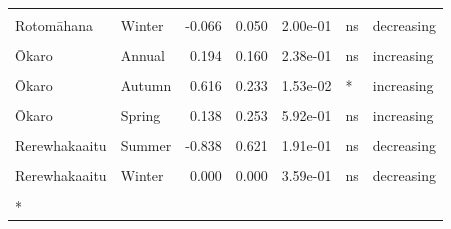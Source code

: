 \documentclass[
  12pt,
  a4paper,
  oneside]{scrbook}
\begin{document}
\begin{longtable}[t]{llrrrll}
\cellcolor{gray!8}{Rotomāhana} & \cellcolor{gray!8}{Autumn} & \cellcolor{gray!8}{-2.721} & \cellcolor{gray!8}{0.545} & \cellcolor{gray!8}{1.12e-04} & \cellcolor{gray!8}{***} & \cellcolor{gray!8}{decreasing}\\
Rotomāhana & Winter & -0.066 & 0.050 & 2.00e-01 & ns & decreasing\\
\cellcolor{gray!8}{Rotomāhana} & \cellcolor{gray!8}{Spring} & \cellcolor{gray!8}{-0.133} & \cellcolor{gray!8}{0.072} & \cellcolor{gray!8}{8.13e-02} & \cellcolor{gray!8}{ns} & \cellcolor{gray!8}{decreasing}\\
\addlinespace
Ōkaro & Annual & 0.194 & 0.160 & 2.38e-01 & ns & increasing\\
\cellcolor{gray!8}{Ōkaro} & \cellcolor{gray!8}{Summer} & \cellcolor{gray!8}{0.142} & \cellcolor{gray!8}{0.346} & \cellcolor{gray!8}{6.85e-01} & \cellcolor{gray!8}{ns} & \cellcolor{gray!8}{increasing}\\
Ōkaro & Autumn & 0.616 & 0.233 & 1.53e-02 & * & increasing\\
\cellcolor{gray!8}{Ōkaro} & \cellcolor{gray!8}{Winter} & \cellcolor{gray!8}{-0.086} & \cellcolor{gray!8}{0.272} & \cellcolor{gray!8}{7.55e-01} & \cellcolor{gray!8}{ns} & \cellcolor{gray!8}{decreasing}\\
Ōkaro & Spring & 0.138 & 0.253 & 5.92e-01 & ns & increasing\\
\addlinespace
\cellcolor{gray!8}{Rerewhakaaitu} & \cellcolor{gray!8}{Annual} & \cellcolor{gray!8}{-0.406} & \cellcolor{gray!8}{0.207} & \cellcolor{gray!8}{6.32e-02} & \cellcolor{gray!8}{ns} & \cellcolor{gray!8}{decreasing}\\
Rerewhakaaitu & Summer & -0.838 & 0.621 & 1.91e-01 & ns & decreasing\\
\cellcolor{gray!8}{Rerewhakaaitu} & \cellcolor{gray!8}{Autumn} & \cellcolor{gray!8}{-0.203} & \cellcolor{gray!8}{0.200} & \cellcolor{gray!8}{3.21e-01} & \cellcolor{gray!8}{ns} & \cellcolor{gray!8}{decreasing}\\
Rerewhakaaitu & Winter & 0.000 & 0.000 & 3.59e-01 & ns & decreasing\\
\cellcolor{gray!8}{Rerewhakaaitu} & \cellcolor{gray!8}{Spring} & \cellcolor{gray!8}{-0.255} & \cellcolor{gray!8}{0.275} & \cellcolor{gray!8}{3.64e-01} & \cellcolor{gray!8}{ns} & \cellcolor{gray!8}{decreasing}\\*

\end{longtable}

\endgroup{}

\clearpage
\renewcommand{\thetable}{S2.\arabic{table}}
\renewcommand{\thefigure}{S2.\arabic{figure}}
\setcounter{table}{0}
\setcounter{figure}{0}
\end{document}
